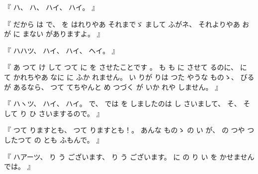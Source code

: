 %
『
ハ、
%
ハ、
%
ハイ、
%
ハイ。
』

%
『
だから
は
で、
%
を
はれりやあ
それまでゞ
まして
ふがネ、
%
それよりやあ
お
が
に
まない
がありますよ。
』

%
『
ハハツ、
%
ハイ、
%
ハイ、
%
ヘイ。
』

%
『
あ
つて
け
して
つて
に
を%
させたことです
。
%
%
も
も
に
させて
るのに、
%
に
て
かれちやあ
なに
に%
ふか
れません。
%
い
りが
りは
つた
やうな
ものゝ、
%
びる
が
あるなら、
%
つて
てちやんと
め
つづく%
が
いか
れや
しません。
』

%
『
ハヽツ、
%
ハイ、
%
ハイ。
%
で、
%
では
を
しましたのは
し
さいまして、
%
そ、
%
そして
り
ひ
さいまするので。
』

%
『
つて
りますとも、
%
つて
りますとも！。
%
あんな
ものゝ
の
い
が、
%
の
つや
つ
したつて
の
とも
ふもんで。
』

%
『
ハアーツ、
%
り
う
ございます、
%
り
う
ございます。
%
に
の
り
い
を
かせませんでは。
』

